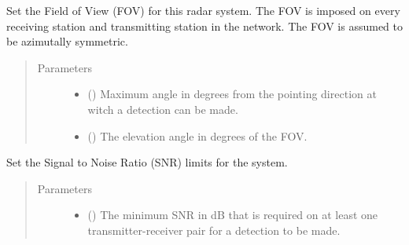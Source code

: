 \documentclass[letterpaper,10pt,english]{sphinxmanual}
\begin{document}
\begin{fulllineitems}
\begin{fulllineitems}
\label{\detokenize{modules/radar_config:radar_config.RadarSystem.draw3d}}
\end{fulllineitems}


\begin{fulllineitems}
\label{\detokenize{modules/radar_config:radar_config.RadarSystem.set_FOV}}
Set the Field of View (FOV) for this radar system. The FOV is imposed on every receiving station and transmitting station in the network. The FOV is assumed to be azimutally symmetric.
\begin{quote}\begin{description}
\item[{Parameters}] \leavevmode\begin{itemize}
\item {} 
 () \textendash{} Maximum angle in degrees from the pointing direction at witch a detection can be made.

\item {} 
 () \textendash{} The elevation angle in degrees of the FOV.

\end{itemize}

\end{description}\end{quote}

\end{fulllineitems}


\begin{fulllineitems}
\label{\detokenize{modules/radar_config:radar_config.RadarSystem.set_SNR_limits}}
Set the Signal to Noise Ratio (SNR) limits for the system.
\begin{quote}\begin{description}
\item[{Parameters}] \leavevmode\begin{itemize}
\item {} 
 () \textendash{} The minimum SNR in dB that is required on at least one transmitter-receiver pair for a detection to be made.


\end{itemize}
\end{description}
\end{quote}
\end{fulllineitems}
\end{fulllineitems}
\end{document}
